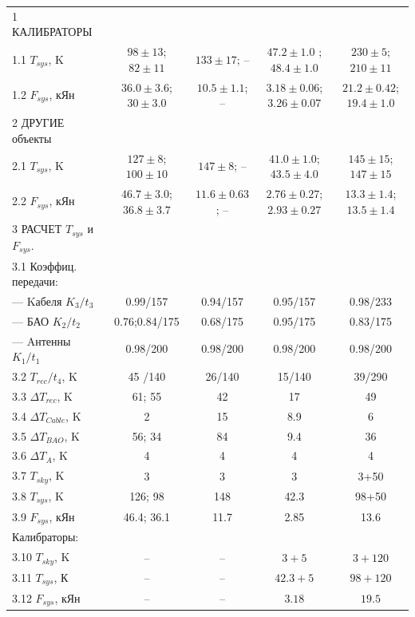 \begin{table}[tbh]
\begin{SingleSpace}
\begin{tabular}{lcccc}
        \midrule
1 КАЛИБРАТОРЫ              & & & &\\
1.1 $T_{sys}$, K    & $98\pm13$; $82\pm11$    & $133\pm17$; --  &
$47.2\pm1.0$ ; $48.4\pm1.0$  & $230\pm5$; $210\pm11$ \\
1.2 $F_{sys}$, кЯн  & $36.0\pm3.6$; $30\pm3.0$ & $10.5\pm1.1$; -- & $3.18\pm0.06$; $3.26\pm0.07$
& $21.2\pm0.42$; $19.4\pm1.0$\\
2 ДРУГИЕ объекты         & & & &\\
2.1 $T_{sys}$, K    & $127\pm8$; $100\pm10$      & $147\pm8$; --  & $41.0\pm1.0$; $43.5\pm4.0$
& $145\pm15$; $147\pm15$\\
2.2 $F_{sys}$, кЯн  & $46.7\pm3.0$; $36.8\pm3.7$ & $11.6\pm0.63$; -- & $2.76\pm0.27$; $2.93\pm0.27$
& $13.3\pm1.4$; $13.5\pm1.4$\\
\midrule
3 РАСЧЕТ $T_{sys}$ и $F_{sys}$.& & & &\\
3.1 Коэффиц. передачи: & & & &\\
--- Kабеля $K_3/t_3$  &  0.99/157      & 0.94/157        & 0.95/157       & 0.98/233 \\
--- БАО $K_2/t_2$     &  0.76;0.84/175 & 0.68/175        & 0.95/175       & 0.83/175 \\
--- Aнтенны $K_1/t_1$ &  0.98/200      & 0.98/200        & 0.98/200       & 0.98/200 \\
3.2 $T_{rec} / t_4$, K   & 45 /140 & 26/140 & 15/140 & 39/290\\
3.3 $\Delta T_{rec}$, K  & 61; 55     & 42     & 17     & 49    \\
3.4 $\Delta T_{Cable}$, K&  2         & 15     & 8.9    &  6    \\
3.5 $\Delta T_{BAO}$, K  & 56; 34     & 84     & 9.4    & 36    \\
3.6 $\Delta T_A$, K      & 4          &  4     & 4      &  4    \\
3.7 $T_{sky}$, K         & 3          &  3     & 3      &  3+50 \\
3.8 $T_{sys}$, K         & 126; 98    & 148    & 42.3   &  98+50\\
3.9 $F_{sys}$, кЯн     & 46.4; 36.1& 11.7& 2.85   & 13.6  \\
Калибраторы: & & & & \\
3.10 $T_{sky}$, K         &    --       &  --     & $3+5$    &  $3+120$  \\
3.11 $T_{sys}$, К         &    --       &  --     & $42.3+5$ &  $98+120$ \\
3.12 $F_{sys}$, кЯн       &    --       &  --     & $3.18$   &  $19.5$    \\
        \bottomrule
        \end{tabular}
    \end{SingleSpace}
\end{table}

